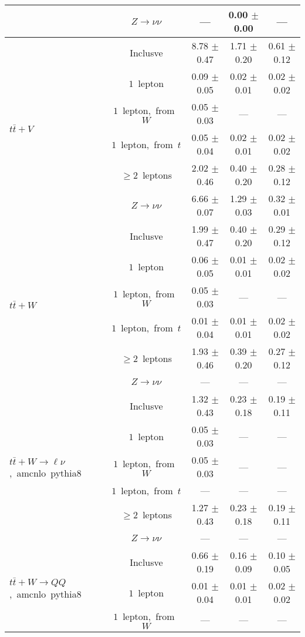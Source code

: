 \documentclass{article}
\begin{document}
\begin{longtable}{|l|c|c|c|c|}
 & $Z\rightarrow\nu\nu$  & ---  & 0.00 $\pm$ 0.00  & --- \\* 
\hline 
\multirow{6}{*}{$t\bar{t}+V$} & Inclusve  & 8.78 $\pm$ 0.47  & 1.71 $\pm$ 0.20  & 0.61 $\pm$ 0.12 \\* 
 & $1$~lepton  & 0.09 $\pm$ 0.05  & 0.02 $\pm$ 0.01  & 0.02 $\pm$ 0.02 \\* 
 & $1$~lepton,~from~$W$  & 0.05 $\pm$ 0.03  & ---  & --- \\* 
 & $1$~lepton,~from~$t$  & 0.05 $\pm$ 0.04  & 0.02 $\pm$ 0.01  & 0.02 $\pm$ 0.02 \\* 
 & $\ge2$~leptons  & 2.02 $\pm$ 0.46  & 0.40 $\pm$ 0.20  & 0.28 $\pm$ 0.12 \\* 
 & $Z\rightarrow\nu\nu$  & 6.66 $\pm$ 0.07  & 1.29 $\pm$ 0.03  & 0.32 $\pm$ 0.01 \\* 
\hline 
\multirow{6}{*}{$t\bar{t}+W$} & Inclusve  & 1.99 $\pm$ 0.47  & 0.40 $\pm$ 0.20  & 0.29 $\pm$ 0.12 \\* 
 & $1$~lepton  & 0.06 $\pm$ 0.05  & 0.01 $\pm$ 0.01  & 0.02 $\pm$ 0.02 \\* 
 & $1$~lepton,~from~$W$  & 0.05 $\pm$ 0.03  & ---  & --- \\* 
 & $1$~lepton,~from~$t$  & 0.01 $\pm$ 0.04  & 0.01 $\pm$ 0.01  & 0.02 $\pm$ 0.02 \\* 
 & $\ge2$~leptons  & 1.93 $\pm$ 0.46  & 0.39 $\pm$ 0.20  & 0.27 $\pm$ 0.12 \\* 
 & $Z\rightarrow\nu\nu$  & ---  & ---  & --- \\* 
\hline 
\multirow{6}{*}{$t\bar{t}+W{\rightarrow}{\ell}{\nu}$,~amcnlo~pythia8} & Inclusve  & 1.32 $\pm$ 0.43  & 0.23 $\pm$ 0.18  & 0.19 $\pm$ 0.11 \\* 
 & $1$~lepton  & 0.05 $\pm$ 0.03  & ---  & --- \\* 
 & $1$~lepton,~from~$W$  & 0.05 $\pm$ 0.03  & ---  & --- \\* 
 & $1$~lepton,~from~$t$  & ---  & ---  & --- \\* 
 & $\ge2$~leptons  & 1.27 $\pm$ 0.43  & 0.23 $\pm$ 0.18  & 0.19 $\pm$ 0.11 \\* 
 & $Z\rightarrow\nu\nu$  & ---  & ---  & --- \\* 
\hline 
\multirow{6}{*}{$t\bar{t}+W{\rightarrow}QQ$,~amcnlo~pythia8} & Inclusve  & 0.66 $\pm$ 0.19  & 0.16 $\pm$ 0.09  & 0.10 $\pm$ 0.05 \\* 
 & $1$~lepton  & 0.01 $\pm$ 0.04  & 0.01 $\pm$ 0.01  & 0.02 $\pm$ 0.02 \\* 
 & $1$~lepton,~from~$W$  & ---  & ---  & --- \\* 

\end{longtable}
\end{document}
